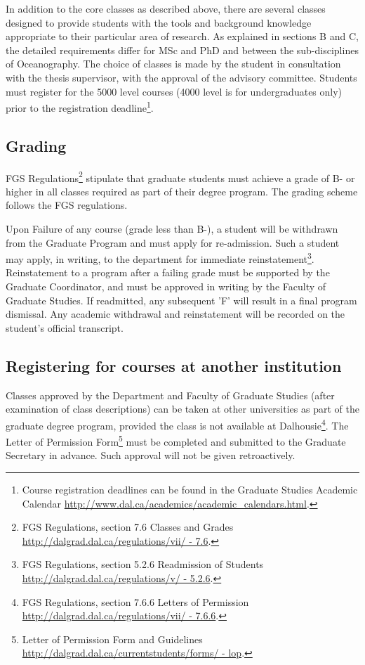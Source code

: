 \documentclass{article}
\newcommand\elink[1]{\url{#1}}
\begin{document}
In addition to the core classes as described above, there are several classes
designed to provide students with the tools and background knowledge
appropriate to their particular area of research. As explained in sections B
and C, the detailed requirements differ for MSc and PhD and between the
sub-disciplines of Oceanography. The choice of classes is made by the student
in consultation with the thesis supervisor, with the approval of the advisory
committee. Students must register for the 5000 level courses (4000 level is for
undergraduates only) prior to the registration deadline\footnote{Course
registration deadlines can be found in the Graduate Studies Academic Calendar
\elink{http://www.dal.ca/academics/academic_calendars.html}.}.

\subsection{Grading}

FGS Regulations\footnote{FGS Regulations, section 7.6 Classes and Grades
\elink{http://dalgrad.dal.ca/regulations/vii/ - 7.6}.} stipulate that graduate
students must achieve a grade of B- or higher in all classes required as part
of their degree program.  The grading scheme follows the FGS regulations.

Upon Failure of any course (grade less than B-), a student will be withdrawn
from the Graduate Program and must apply for re-admission. Such a student may
apply, in writing, to the department for immediate reinstatement\footnote{FGS
Regulations, section 5.2.6 Readmission of Students
\elink{http://dalgrad.dal.ca/regulations/v/ - 5.2.6}.}.  Reinstatement to a
program after a failing grade must be supported by the Graduate Coordinator,
and must be approved in writing by the Faculty of Graduate Studies. If
readmitted, any subsequent 'F' will result in a final program dismissal. Any
academic withdrawal and reinstatement will be recorded on the student's
official transcript.

\subsection{Registering for courses at another institution}

Classes approved by the Department and Faculty of Graduate Studies (after
examination of class descriptions) can be taken at other universities as part
of the graduate degree program, provided the class is not available at
Dalhousie\footnote{FGS Regulations, section 7.6.6 Letters of Permission
\elink{http://dalgrad.dal.ca/regulations/vii/ - 7.6.6}.}.  The Letter of
Permission Form\footnote{Letter of Permission Form and Guidelines
\elink{http://dalgrad.dal.ca/currentstudents/forms/ - lop}.} must be completed
and submitted to the Graduate Secretary in advance. Such approval will not be
given retroactively.
\end{document}
